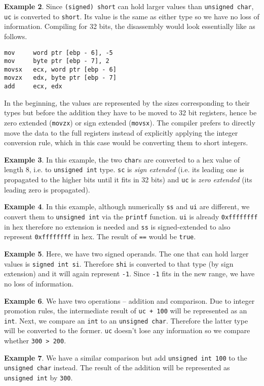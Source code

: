 \textbf{Example 2}. Since \texttt{(signed) short} can hold larger values than \texttt{unsigned char}, \texttt{uc} is converted to \texttt{short}. Its value is the same as either type so we have no loss of information. Compiling for 32 bits, the disassembly would look essentially like as follows.
\begin{verbatim}
mov     word ptr [ebp - 6], -5
mov     byte ptr [ebp - 7], 2
movsx   ecx, word ptr [ebp - 6]
movzx   edx, byte ptr [ebp - 7]
add     ecx, edx
\end{verbatim}
In the beginning, the values are represented by the sizes corresponding to their types but before the addition they have to be moved to 32 bit registers, hence be zero extended (\texttt{movzx}) or sign extended (\texttt{movsx}). The compiler prefers to directly move the data to the full registers instead of explicitly applying the integer conversion rule, which in this case would be converting them to short integers.

\textbf{Example 3}. In this example, the two \texttt{char}s are converted to a hex value of length 8, i.e. to \texttt{unsigned int} type. \texttt{sc} is \textit{sign extended} (i.e. its leading one is propagated to the higher bits until it fits in 32 bits) and \texttt{uc} is \textit{zero extended} (its leading zero is propagated).

\textbf{Example 4}. In this example, although numerically \texttt{ss} and \texttt{ui} are different, we convert them to \texttt{unsigned int} via the \texttt{printf} function. \texttt{ui} is already \texttt{0xffffffff} in hex therefore no extension is needed and \texttt{ss} is signed-extended to also represent \texttt{0xffffffff} in hex. The result of \texttt{==} would be \texttt{true}.  

\textbf{Example 5}. Here, we have two signed operands. The one that can hold larger values is \texttt{signed int si}. Therefore \texttt{shi} is converted to that type (by sign extension) and it will again represent \texttt{-1}. Since \texttt{-1} fits in the new range, we have no loss of information. 

\textbf{Example 6}. We have two operations -- addition and comparison. Due to integer promotion rules, the intermediate result of \texttt{uc + 100} will be represented as an \texttt{int}. Next, we compare an \texttt{int} to an \texttt{unsigned char}. Therefore the latter type will be converted to the former. \texttt{uc} doesn't lose any information so we compare whether \texttt{300 > 200}.

\textbf{Example 7}. We have a similar comparison but add \texttt{unsigned int 100} to the \texttt{unsigned char} instead. The result of the addition will be represented as \texttt{unsigned int} by \texttt{300}.

